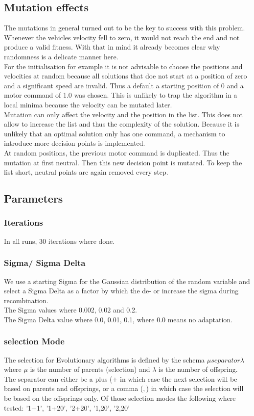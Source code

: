 \documentclass{scrartcl}
\begin{document}
\subsection{Mutation effects}
The mutations in general turned out to be the key to success with this problem. Whenever the vehicles velocity fell to zero, it would not reach the end and not produce a valid fitness. With that in mind it already becomes clear why randomness is a delicate manner here.\\
For the initialisation for example it is not advisable to choose the positions and velocities at random because all solutions that doe not start at a position of zero and a significant speed are invalid. Thus a default a starting position of 0 and a motor command of 1.0 was chosen. This is unlikely to trap the algorithm in a local minima because the velocity can be mutated later.\\
Mutation can only affect the velocity and the position in the list. This does not allow to increase the list and thus the complexity of the solution. Because it is unlikely that an optimal solution only has one command, a mechanism to introduce more decision points is implemented.\\
At random positions, the previous motor command is duplicated. Thus the mutation at first neutral. Then this new decision point is mutated. To keep the list short, neutral points are again removed every step.

\subsection{Parameters}
\subsubsection{Iterations}
In all runs, 30 iterations where done.

\subsubsection{Sigma/ Sigma Delta}
We use a starting Sigma for the Gaussian distribution of the random variable and select a Sigma Delta as a factor by which the de- or increase the sigma during recombination.\\
The Sigma values where 0.002, 0.02 and 0.2.\\
The Sigma Delta value where 0.0, 0.01, 0.1, where 0.0 means no adaptation.

\subsubsection{selection Mode}
The selection for Evolutionary algorithms is defined by the schema $\mu separator \lambda$ where $\mu$ is the number of parents (selection) and $\lambda$ is the number of offspring. The separator can either be a plus ($+$ in which case the next selection will be based on parents and offsprings, or a comma ($,$) in which case the selection will be based on the offsprings only.
Of those selection modes the following where tested: '1+1', '1+20', '2+20', '1,20', '2,20'
\end{document}
